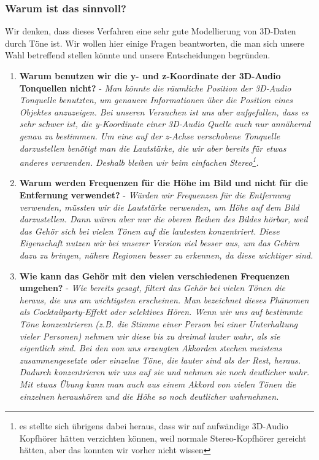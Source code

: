 \documentclass[a4paper,12pt,ngerman]{scrartcl}
\begin{document}
\subsubsection{Warum ist das sinnvoll?}

Wir denken, dass dieses Verfahren eine sehr gute Modellierung von 3D-Daten durch Töne ist. Wir wollen hier einige 
Fragen beantworten, die man sich unsere Wahl betreffend stellen könnte und unsere Entscheidungen begründen.
\begin{enumerate}
	\item \textbf{Warum benutzen wir die y- und z-Koordinate der 3D-Audio Tonquellen nicht?} - \textit{Man könnte die
	räumliche Position der 3D-Audio Tonquelle benutzten, um genauere Informationen über die Position eines
	Objektes anzuzeigen. Bei unseren Versuchen ist uns aber aufgefallen, dass es sehr schwer ist, die y-Koordinate einer 3D-Audio Quelle auch nur annähernd genau zu bestimmen. Um eine auf der z-Achse verschobene Tonquelle 
	darzustellen benötigt man die Lautstärke, die wir aber bereits für etwas anderes verwenden. Deshalb
	bleiben wir beim einfachen Stereo\footnote{es stellte sich übrigens dabei heraus, dass wir auf aufwändige
	3D-Audio Kopfhörer hätten verzichten können, weil normale Stereo-Kopfhörer gereicht hätten, aber das konnten wir vorher nicht wissen}.}
	\item \textbf{Warum werden Frequenzen für die Höhe im Bild und nicht für die Entfernung verwendet?} - \textit{Würden wir Frequenzen für die Entfernung verwenden, müssten wir die Lautstärke verwenden, um Höhe auf dem Bild darzustellen. Dann wären aber nur die oberen Reihen des Bildes 
	hörbar, weil das Gehör sich bei vielen Tönen auf die lautesten konzentriert. Diese Eigenschaft nutzen wir bei 
	unserer Version viel besser aus, 
	um das Gehirn dazu zu bringen, nähere Regionen besser zu erkennen, da diese wichtiger sind.}
	\item \textbf{Wie kann das Gehör mit den vielen verschiedenen Frequenzen umgehen?} - \textit{Wie bereits gesagt, filtert das 
	Gehör bei vielen Tönen die heraus, die uns am wichtigsten erscheinen. Man bezeichnet dieses Phänomen als Cocktailparty-Effekt 
	oder selektives Hören. Wenn wir uns auf bestimmte Töne konzentrieren (z.B. die Stimme einer Person bei einer Unterhaltung vieler
	Personen) nehmen wir diese bis zu dreimal lauter wahr, als sie eigentlich sind. Bei den von uns erzeugten Akkorden stechen meistens
	zusammengesetzte oder einzelne Töne, die lauter sind als der Rest, heraus. Dadurch konzentrieren wir uns auf sie und nehmen sie noch deutlicher wahr. Mit etwas Übung kann man auch aus einem Akkord von vielen Tönen 
	die einzelnen heraushören und die Höhe so noch deutlicher wahrnehmen.}
\end{enumerate}
\end{document}
